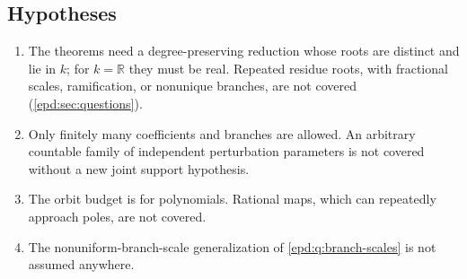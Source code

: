 \documentclass[11pt,a4paper]{article}
\numberwithin{equation}{section}
\theoremstyle{plain}
\theoremstyle{definition}
\theoremstyle{remark}
\newcommand{\R}{\mathbb R}
\begin{document}
\subsection*{Hypotheses}
\begin{enumerate}[label=\textbf{S\arabic*.},leftmargin=2.8em,resume]
\item The theorems need a degree-preserving reduction whose roots are
distinct and lie in $k$; for $k=\R$ they must be real. Repeated residue roots,
with fractional scales, ramification, or nonunique branches, are not
covered (\cref{epd:sec:questions}).
\item Only finitely many coefficients and branches are allowed. An
arbitrary countable family of independent perturbation parameters is not
covered without a new joint support hypothesis.
\item The orbit budget is for polynomials. Rational maps, which can
repeatedly approach poles, are not covered.
\item The nonuniform-branch-scale generalization of
\cref{epd:q:branch-scales} is not assumed anywhere.
\end{enumerate}
\end{document}
